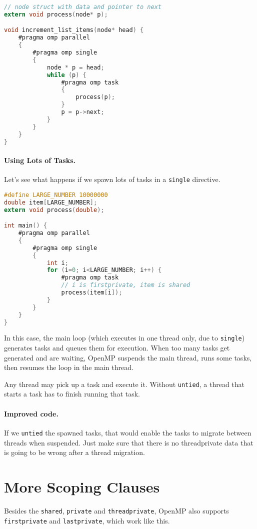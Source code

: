   \begin{lstlisting}[language=C]
// node struct with data and pointer to next
extern void process(node* p);

void increment_list_items(node* head) {
    #pragma omp parallel
    {
        #pragma omp single
        {
            node * p = head;
            while (p) {
                #pragma omp task
                {
                    process(p);
                }
                p = p->next;
            }
        }
    }
}
  \end{lstlisting}

\paragraph{Using Lots of Tasks.} Let's see what happens
if we spawn lots of tasks in a {\tt single} directive.

  \begin{lstlisting}[language=C]
#define LARGE_NUMBER 10000000
double item[LARGE_NUMBER];
extern void process(double);

int main() {
    #pragma omp parallel
    {
        #pragma omp single
        {
            int i;
            for (i=0; i<LARGE_NUMBER; i++) {
                #pragma omp task
                // i is firstprivate, item is shared
                process(item[i]);
            }
        }
    }
}
  \end{lstlisting}

In this case, the main loop (which executes in one thread only, due to {\tt single}) generates tasks and queues them for execution. When too many tasks get generated and are waiting, OpenMP suspends the main thread, runs some tasks, then resumes the loop in the main thread.

Any thread may pick up a task and execute it. Without {\tt untied}, a thread that starts a task has to finish running that task.

\paragraph{Improved code.} If we {\tt untied} the spawned tasks, that would enable the tasks to
migrate between threads when suspended. Just make sure that there is no threadprivate data that
is going to be wrong after a thread migration.

\section*{More Scoping Clauses}
Besides the {\tt shared}, {\tt private} and {\tt threadprivate}, OpenMP also 
supports {\tt firstprivate} and {\tt lastprivate}, which work like this.


